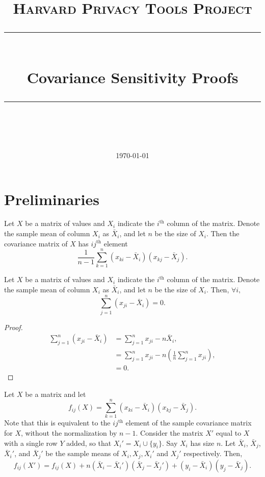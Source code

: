 \documentclass[11pt]{scrartcl} %
\title{
	\normalfont\normalsize
	\textsc{Harvard Privacy Tools Project}\\ %
	\vspace{25pt} %
	\rule{\linewidth}{0.5pt}\\ %
	\vspace{20pt} %
	{\huge Covariance Sensitivity Proofs}\\ %
	\vspace{12pt} %
	\rule{\linewidth}{2pt}\\ %
	\vspace{12pt} %
}
\date{\normalsize\today} %
\begin{document}
\maketitle

\section{Preliminaries}

\begin{definition}
Let $X$ be a matrix of values and $X_i$ indicate the $i^{\text{th}}$ column of the matrix. Denote the sample mean of column $X_i$ as $\bar{X}_i$, and let $n$ be the size of $X_i$. Then the covariance matrix of $X$ has $ij^{\text{th}}$ element 
$$ \frac{1}{n-1} \sum_{k=1}^n (x_{ki} - \bar{X}_i)(x_{kj} - \bar{X}_j).$$
\end{definition}
\begin{lemma}
\label{lemma:cancel}
Let $X$ be a matrix of values and $X_i$ indicate the $i^{\text{th}}$ column of the matrix. Denote the sample mean of column $X_i$ as $\bar{X}_i$, and let $n$ be the size of $X_i$. Then,
$\forall i,$
$$ \sum_{j=1}^n (x_{ji} - \bar{X}_i) = 0.$$
\end{lemma}

\begin{proof}
\begin{align*}
\sum_{j=1}^n (x_{ji} - \bar{X}_i) &= \sum_{j=1}^n x_{ji} - n \bar{X}_i,\\
	&= \sum_{j=1}^n x_{ji} - n\left( \frac{1}{n}\sum_{j=1}^n x_{ji}\right), \\
	&= 0.
\end{align*}
\end{proof}

\begin{lemma}
\label{cov:rewrite}
Let $X$ be a matrix and let
$$ f_{ij}(X) = \sum_{k=1}^n (x_{ki} - \bar{X}_i)(x_{kj} - \bar{X}_j).$$
Note that this is equivalent to the $ij^{\text{th}}$ element of the sample covariance matrix for $X$, without the normalization by $n-1$. Consider the matrix $X'$ equal to $X$ with a single row $Y$ added, so that $X_i' = X_i \cup \{y_i\}$. Say $X_i$ has size $n$. Let  $\bar{X}_i$, $\bar{X}_j$, $\bar{X}_i'$, and $\bar{X}_j'$ be the sample means of $X_i, X_j, X_i'$ and $X_j'$ respectively. Then,
$$ f_{ij}(X') = f_{ij}(X) + n(\bar{X}_i - \bar{X}_i')(\bar{X}_j - \bar{X}_j') + (y_i - \bar{X}_i)(y_j - \bar{X}_j).$$
\end{lemma}
\end{document}

